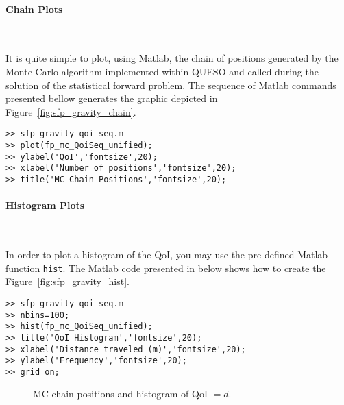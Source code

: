 \paragraph{Chain Plots} \

It is quite simple to plot, using Matlab, the chain of positions generated by the Monte Carlo algorithm
implemented within QUESO and called during the solution of the statistical forward problem.
The sequence of Matlab commands presented bellow generates the graphic depicted in
Figure~\ref{fig:sfp_gravity_chain}.

\begin{lstlisting}[label=matlab:chain_qoi,caption={Matlab code for the chain plot.}]
% inside Matlab
>> sfp_gravity_qoi_seq.m
>> plot(fp_mc_QoiSeq_unified);
>> ylabel('QoI','fontsize',20);
>> xlabel('Number of positions','fontsize',20);
>> title('MC Chain Positions','fontsize',20);
\end{lstlisting}


\paragraph{Histogram Plots} \

In order to plot a histogram of the QoI, you may use the pre-defined Matlab function \verb+hist+.
The Matlab code presented in below shows how to create the Figure~\ref{fig:sfp_gravity_hist}.

\begin{lstlisting}[label=matlab:hist_qoi,caption={Matlab code for the QoI histogram plot.}]
>> sfp_gravity_qoi_seq.m
>> nbins=100;
>> hist(fp_mc_QoiSeq_unified);
>> title('QoI Histogram','fontsize',20);
>> xlabel('Distance traveled (m)','fontsize',20);
>> ylabel('Frequency','fontsize',20);
>> grid on;
\end{lstlisting}

\begin{figure}[h]
\centering
{}
\vspace{-6pt}
\caption{MC chain positions and histogram of QoI $=d$.}
\end{figure}

